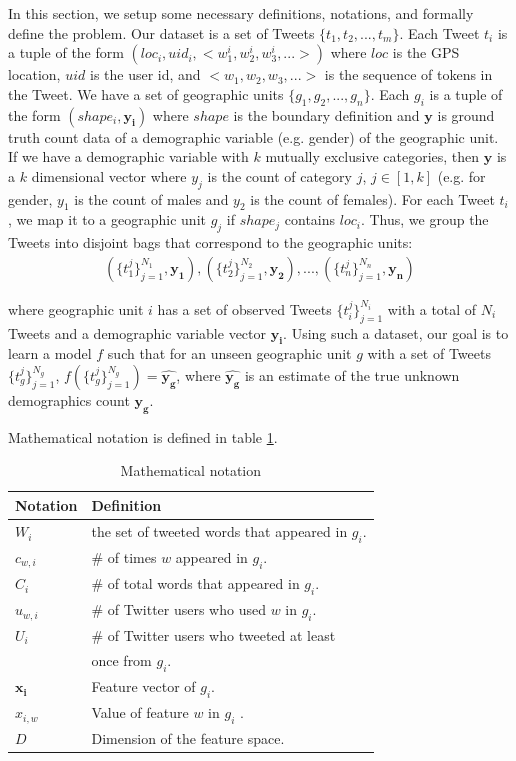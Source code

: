 \documentclass[letterpaper]{article}
\begin{document}
\noindent In this section, we setup some necessary definitions, notations, and formally define the problem. Our dataset is a set of Tweets $\{t_1, t_2, ..., t_m\}$. Each Tweet $t_i$ is a tuple of the form $(loc_i, uid_i, <w^i_1, w^i_2, w^i_3, ...>)$ where $loc$ is the GPS location, $uid$ is the user id, and $<w_1, w_2, w_3, ...>$ is the sequence of tokens in the Tweet. We have a set of geographic units $\{g_1, g_2, ..., g_n\}$. Each $g_i$ is a tuple of the form $(shape_i, \mathbf{y_i})$ where $shape$ is the boundary definition and $\mathbf{y}$ is ground truth count data of a demographic variable (e.g. gender) of the geographic unit. If we have a demographic variable with $k$ mutually exclusive categories, then $\mathbf{y}$ is a $k$ dimensional vector where $y_j$ is the count of category $j$, $j \in [1,k]$ (e.g. for gender, $y_1$ is the count of males and $y_2$ is the count of females). For each Tweet $t_i$, we map it to a geographic unit $g_j$ if $shape_j$ contains $loc_i$. Thus, we group the Tweets into disjoint bags that correspond to the geographic units:
\begin{align*}
    (\{t_1^j\}_{j=1}^{N_1}, \mathbf{y_1}), (\{t_2^j\}_{j=1}^{N_2}, \mathbf{y_2}), ..., (\{t_n^j\}_{j=1}^{N_n}, \mathbf{y_n})
\end{align*}

where geographic unit $i$ has a set of observed Tweets $\{t_i^j\}_{j=1}^{N_i}$ with a total of $N_i$ Tweets and a demographic variable vector $\mathbf{y_i}$. Using such a dataset, our goal is to learn a model $f$ such that for an unseen geographic unit $g$ with a set of Tweets $\{t_g^j\}_{j=1}^{N_g}$, $f(\{t_g^j\}_{j=1}^{N_g}) = \widehat{\mathbf{y_g}}$, where $\widehat{\mathbf{y_g}}$ is an estimate of the true unknown demographics count $\mathbf{y_g}$.

Mathematical notation is defined in table \ref{table:1}.
\begin{table}[t]
\begin{tabular}{|l|l|}
\hline
{\bf Notation} & {\bf Definition}\\
\hline
$W_i$ & the set of tweeted words that appeared in $g_i$.\\
\hline
$c_{w,i}$ & \# of times $w$ appeared in $g_i$.\\
\hline
$C_i$ & \# of total words that appeared in $g_i$.\\
\hline
$u_{w,i}$ & \# of Twitter users who used $w$ in $g_i$.\\
\hline
$U_i$ & \# of Twitter users who tweeted at least \\
& once from $g_i$.\\
\hline
$\mathbf{x_i}$ & Feature vector of $g_i$.\\
\hline
$x_{i,w}$ & Value of feature $w$ in $g_i$ .\\
\hline
$D$ & Dimension of the feature space.\\
\hline
\end{tabular}
\caption{Mathematical notation}
\label{table:1}
\end{table}
\end{document}
